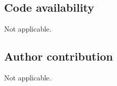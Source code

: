 \documentclass[pdflatex,sn-mathphys-num]{sn-jnl}
\theoremstyle{thmstyleone}
\theoremstyle{thmstyletwo}
\theoremstyle{thmstylethree}
\begin{document}
\subsection*{Code availability}
Not applicable.

\subsection*{Author contribution}
Not applicable.





\end{document}
